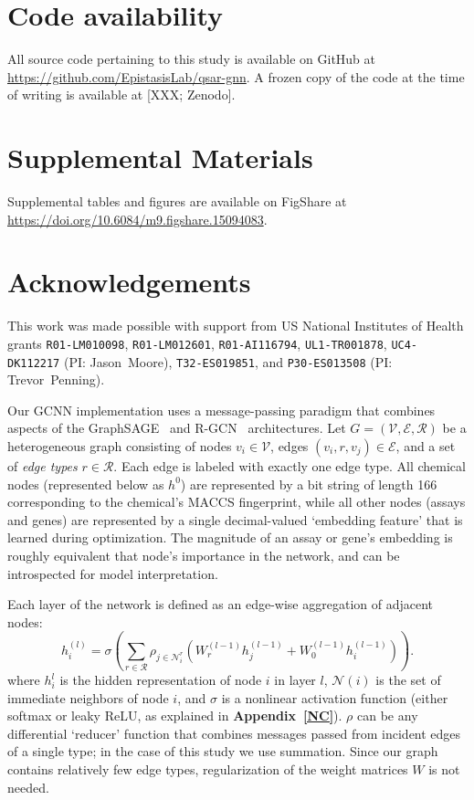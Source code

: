 \documentclass{ws-procs11x85}
\begin{document}
\section{Code availability}
All source code pertaining to this study is available on GitHub at \url{https://github.com/EpistasisLab/qsar-gnn}.
A frozen copy of the code at the time of writing is available at [XXX; Zenodo].

\section{Supplemental Materials}
Supplemental tables and figures are available on FigShare at \url{https://doi.org/10.6084/m9.figshare.15094083}.

\section*{Acknowledgements}
This work was made possible with support from US National Institutes of Health grants \texttt{R01-LM010098}, \texttt{R01-LM012601}, \texttt{R01-AI116794}, \texttt{UL1-TR001878}, \texttt{UC4-DK112217} (PI: Jason~Moore), \texttt{T32-ES019851}, and \texttt{P30-ES013508} (PI: Trevor~Penning).

\label{GCNN}
Our GCNN implementation uses a message-passing paradigm that combines aspects of the GraphSAGE~\cite{hamilton2017inductive} and R-GCN~\cite{schlichtkrull2018modeling} architectures.
Let $G = (\mathcal{V}, \mathcal{E}, \mathcal{R})$ be a heterogeneous graph consisting of nodes $v_i \in \mathcal{V}$, edges $(v_i, r, v_j)\in\mathcal{E}$, and a set of \textit{edge types} $r\in\mathcal{R}$.
Each edge is labeled with exactly one edge type.
All chemical nodes (represented below as $h^0$) are represented by a bit string of length 166 corresponding to the chemical's MACCS fingerprint, while all other nodes (assays and genes) are represented by a single decimal-valued `embedding feature' that is learned during optimization.
The magnitude of an assay or gene's embedding is roughly equivalent that node's importance in the network, and can be introspected for model interpretation.

Each layer of the network is defined as an edge-wise aggregation of adjacent nodes:
\begin{equation}
   h_i^{(l)} = \sigma \left(\sum_{r\in\mathcal{R}}\rho_{j\in\mathcal{N}_i^r}\left(W_r^{(l-1)} h_j^{(l-1)} + W_0^{(l-1)} h_i^{(l-1)}\right) \right).\label{eq:a1}
\end{equation}
where $h_i^l$ is the hidden representation of node $i$ in layer $l$, $\mathcal{N}(i)$ is the set of immediate neighbors of node $i$, and $\sigma$ is a nonlinear activation function (either softmax or leaky ReLU, as explained in \textbf{Appendix~\ref{NC}}).
$\rho$ can be any differential `reducer' function that combines messages passed from incident edges of a single type; in the case of this study we use summation.
Since our graph contains relatively few edge types, regularization of the weight matrices $W$ is not needed.
\end{document}
